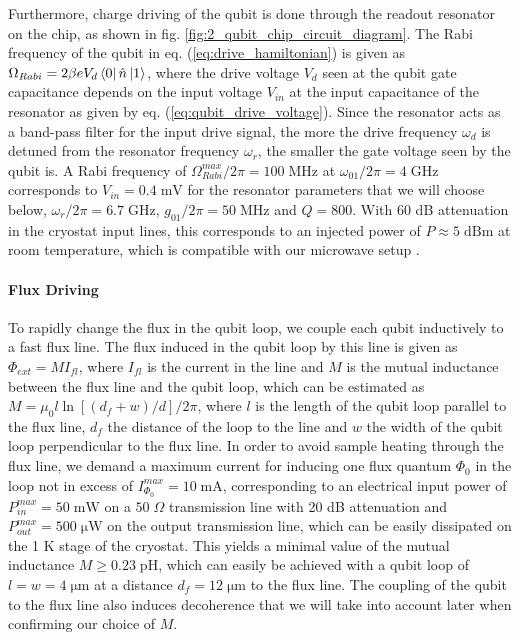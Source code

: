 Furthermore, charge driving of the qubit is done through the readout resonator on the chip, as shown in fig. \ref{fig:2_qubit_chip_circuit_diagram}. The Rabi frequency of the qubit in eq. (\ref{eq:drive_hamiltonian}) is given as $\Omega_{Rabi}= 2 \beta e V_d \left< 0 \right|\hat{n}\left| 1 \right>$, where the drive voltage $V_d$ seen at the qubit gate capacitance depends on the input voltage $V_{in}$ at the input capacitance of the resonator as given by eq. (\ref{eq:qubit_drive_voltage}). Since the resonator acts as a band-pass filter for the input drive signal, the more the drive frequency $\omega_d$ is detuned from the resonator frequency $\omega_r$, the smaller the gate voltage seen by the qubit is. A Rabi frequency of $\Omega_{Rabi}^{max}/2\pi=100\;\mathrm{MHz}$ at $\omega_{01}/2\pi=4\;\mathrm{GHz}$ corresponds to $V_{in}=0.4\;\mathrm{mV}$ for the resonator parameters that we will choose below, $\omega_r/2\pi = 6.7\;\mathrm{GHz}$, $g_{01}/2\pi=50\;\mathrm{MHz}$ and $Q=800$. With 60 dB attenuation in the cryostat input lines, this corresponds to an injected power of $P\approx 5\;\mathrm{dBm}$ at room temperature, which is compatible with our microwave setup .

\paragraph{Flux Driving}

To rapidly change the flux in the qubit loop, we couple each qubit inductively to a fast flux line. The flux induced in the qubit loop by this line is given as $\Phi_{ext}=M I_{fl}$, where $I_{fl}$ is the current in the line and $M$ is the mutual inductance between the flux line and the qubit loop, which can be estimated as $M=\mu_0 l \ln{\left[(d_f+w)/d\right]}/2\pi$, where $l$ is the length of the qubit loop parallel to the flux line, $d_f$ the distance of the loop to the line and $w$ the width of the qubit loop perpendicular to the flux line. In order to avoid sample heating through the flux line, we demand a maximum current for inducing one flux quantum $\Phi_0$ in the loop not in excess of $I_{\Phi_0}^{max}=10\;\mathrm{mA}$, corresponding to an electrical input power of $P^{max}_{in}=50\;\mathrm{mW}$ on a $50 \; \Omega$ transmission line with 20 dB attenuation and $P^{max}_{out}=500\;\mathrm{\mu W}$ on the output transmission line, which can be easily dissipated on the 1 K stage of the cryostat. This yields a minimal value of the mutual inductance $M\ge 0.23\;\mathrm{pH}$, which can easily be achieved with a qubit loop of $l=w=4\;\mathrm{\mu m}$ at a distance $d_f=12\;\mathrm{\mu m}$ to the flux line. The coupling of the qubit to the flux line also induces decoherence that we will take into account later when confirming our choice of $M$.

